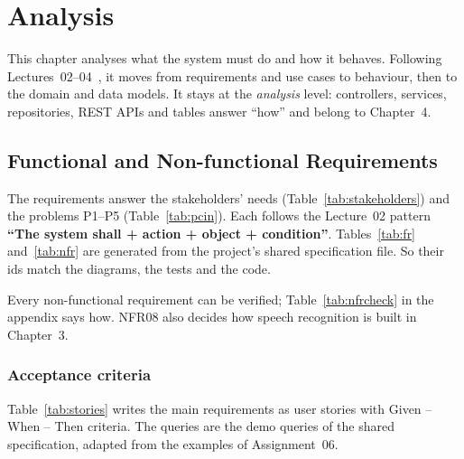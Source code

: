 \chapter{Analysis}\label{ch:analysis}\label{ch:2}

This chapter analyses what the system must do and how it behaves. Following
Lectures~02--04~\cite{slidesL02,slidesL03,slidesL04}, it moves from requirements and use cases to behaviour, then to
the domain and data models. It stays at the \emph{analysis} level: controllers, services, repositories, REST APIs
and tables answer ``how'' and belong to Chapter~4.

\section{Functional and Non-functional Requirements}\label{sec:frnfr}\label{sec:1.9}

The requirements answer the stakeholders' needs (Table~\ref{tab:stakeholders}) and the problems P1--P5
(Table~\ref{tab:pcin}). Each follows the Lecture~02 pattern \textbf{``The system shall + action + object +
condition''}. Tables~\ref{tab:fr} and~\ref{tab:nfr} are generated from the project's shared specification file. So
their ids match the diagrams, the tests and the code.





Every non-functional requirement can be verified; Table~\ref{tab:nfrcheck} in the appendix says how. NFR08 also
decides how speech recognition is built in Chapter~3.

\subsection{Acceptance criteria}

Table~\ref{tab:stories} writes the main requirements as user stories with Given -- When -- Then criteria. The
queries are the demo queries of the shared specification, adapted from the examples of Assignment~06.

